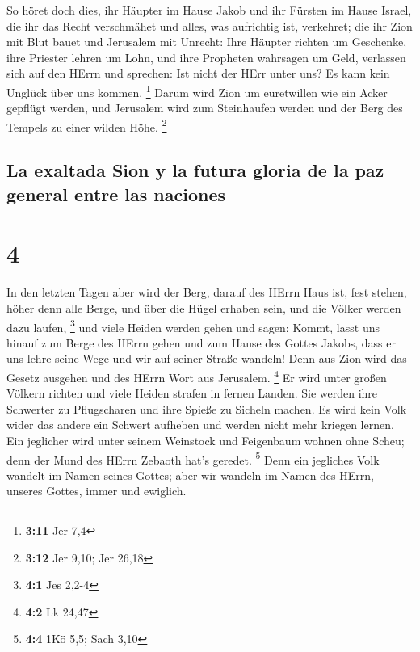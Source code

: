  So höret doch dies, ihr Häupter im Hause Jakob und ihr
Fürsten im Hause Israel, die ihr das Recht verschmähet und alles, was
aufrichtig ist, verkehret;  die ihr Zion mit Blut bauet
und Jerusalem mit Unrecht:  Ihre Häupter richten um
Geschenke, ihre Priester lehren um Lohn, und ihre Propheten wahrsagen um
Geld, verlassen sich auf den HErrn und sprechen: Ist nicht der HErr
unter uns? Es kann kein Unglück über uns kommen. \footnote{\textbf{3:11}
  Jer 7,4}  Darum wird Zion um euretwillen wie ein Acker
gepflügt werden, und Jerusalem wird zum Steinhaufen werden und der Berg
des Tempels zu einer wilden Höhe. \footnote{\textbf{3:12} Jer 9,10; Jer
  26,18}

\hypertarget{la-exaltada-sion-y-la-futura-gloria-de-la-paz-general-entre-las-naciones}{%
\subsection{La exaltada Sion y la futura gloria de la paz general entre
las
naciones}\label{la-exaltada-sion-y-la-futura-gloria-de-la-paz-general-entre-las-naciones}}

\hypertarget{section-3}{%
\section{4}\label{section-3}}

 In den letzten Tagen aber wird der Berg, darauf des HErrn
Haus ist, fest stehen, höher denn alle Berge, und über die Hügel erhaben
sein, und die Völker werden dazu laufen, \footnote{\textbf{4:1} Jes
  2,2-4}  und viele Heiden werden gehen und sagen: Kommt,
lasst uns hinauf zum Berge des HErrn gehen und zum Hause des Gottes
Jakobs, dass er uns lehre seine Wege und wir auf seiner Straße wandeln!
Denn aus Zion wird das Gesetz ausgehen und des HErrn Wort aus Jerusalem.
\footnote{\textbf{4:2} Lk 24,47}  Er wird unter großen
Völkern richten und viele Heiden strafen in fernen Landen. Sie werden
ihre Schwerter zu Pflugscharen und ihre Spieße zu Sicheln machen. Es
wird kein Volk wider das andere ein Schwert aufheben und werden nicht
mehr kriegen lernen.  Ein jeglicher wird unter seinem
Weinstock und Feigenbaum wohnen ohne Scheu; denn der Mund des HErrn
Zebaoth hat's geredet. \footnote{\textbf{4:4} 1Kö 5,5; Sach 3,10}
 Denn ein jegliches Volk wandelt im Namen seines Gottes;
aber wir wandeln im Namen des HErrn, unseres Gottes, immer und ewiglich.

